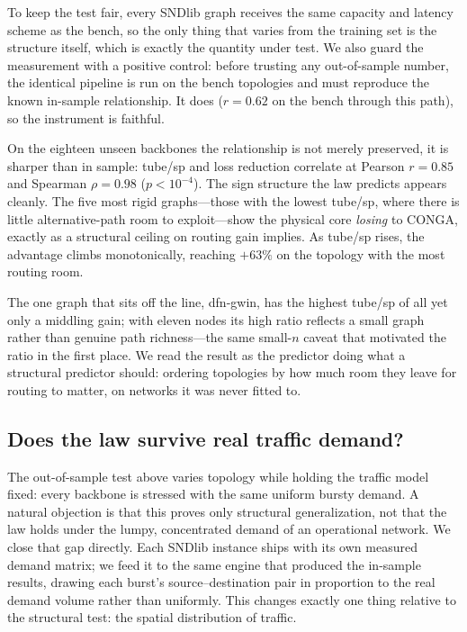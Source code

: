To keep the test fair, every SNDlib graph receives the same capacity and
latency scheme as the bench, so the only thing that varies from the training
set is the structure itself, which is exactly the quantity under test. We also
guard the measurement with a positive control: before trusting any
out-of-sample number, the identical pipeline is run on the bench topologies and
must reproduce the known in-sample relationship. It does ($r=0.62$ on the
bench through this path), so the instrument is faithful.

On the eighteen unseen backbones the relationship is not merely preserved, it
is sharper than in sample: tube/sp and loss reduction correlate at Pearson
$r=0.85$ and Spearman $\rho=0.98$ ($p<10^{-4}$). The sign structure the law
predicts appears cleanly. The five most rigid graphs---those with the lowest
tube/sp, where there is little alternative-path room to exploit---show the
physical core \emph{losing} to CONGA, exactly as a structural ceiling on
routing gain implies. As tube/sp rises, the advantage climbs monotonically,
reaching $+63\%$ on the topology with the most routing room.

The one graph that sits off the line, dfn-gwin, has the highest tube/sp of all
yet only a middling gain; with eleven nodes its high ratio reflects a small
graph rather than genuine path richness---the same small-$n$ caveat that
motivated the ratio in the first place. We read the result as the predictor
doing what a structural predictor should: ordering topologies by how much room
they leave for routing to matter, on networks it was never fitted to.


\subsection{Does the law survive real traffic demand?}
\label{sec:real-demand}

The out-of-sample test above varies topology while holding the traffic model
fixed: every backbone is stressed with the same uniform bursty demand. A
natural objection is that this proves only structural generalization, not that
the law holds under the lumpy, concentrated demand of an operational network.
We close that gap directly. Each SNDlib instance ships with its own measured
demand matrix; we feed it to the same engine that produced the in-sample
results, drawing each burst's source--destination pair in proportion to the
real demand volume rather than uniformly. This changes exactly one thing
relative to the structural test: the spatial distribution of traffic.

